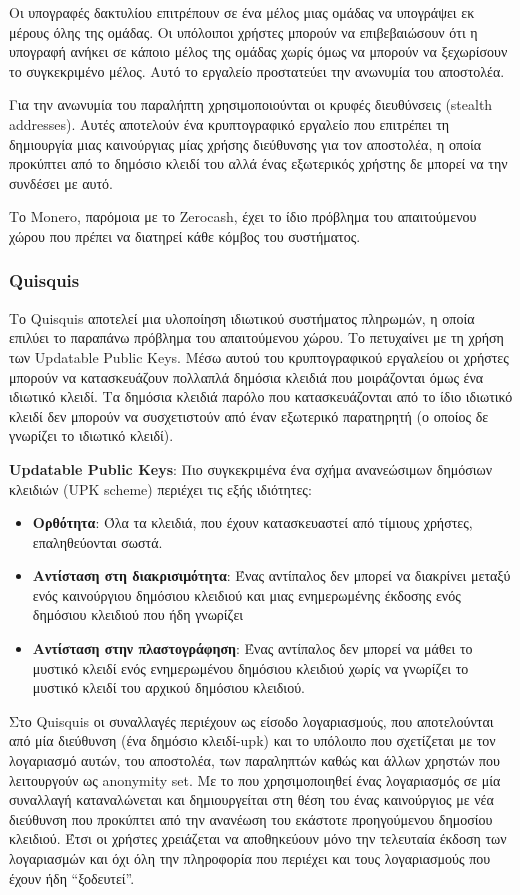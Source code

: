 Οι υπογραφές δακτυλίου επιτρέπουν σε ένα μέλος μιας ομάδας να υπογράψει εκ μέρους όλης της ομάδας. Οι υπόλοιποι χρήστες μπορούν να επιβεβαιώσουν ότι η υπογραφή ανήκει σε κάποιο μέλος της ομάδας χωρίς όμως να μπορούν να ξεχωρίσουν το συγκεκριμένο μέλος. Αυτό το εργαλείο προστατεύει την ανωνυμία του αποστολέα.

Για την ανωνυμία του παραλήπτη χρησιμοποιούνται οι κρυφές διευθύνσεις (stealth addresses). Αυτές αποτελούν ένα κρυπτογραφικό εργαλείο που  επιτρέπει τη δημιουργία μιας καινούργιας μίας χρήσης διεύθυνσης για τον αποστολέα, η οποία προκύπτει από το δημόσιο κλειδί του αλλά ένας εξωτερικός χρήστης δε μπορεί να την συνδέσει με αυτό.

Το Monero, παρόμοια με το Zerocash, έχει το ίδιο πρόβλημα του απαιτούμενου χώρου που πρέπει να διατηρεί κάθε κόμβος του συστήματος.

\subsubsection{Quisquis}
Το Quisquis αποτελεί μια υλοποίηση ιδιωτικού συστήματος πληρωμών, η οποία επιλύει το παραπάνω πρόβλημα του απαιτούμενου χώρου. Το πετυχαίνει με τη χρήση των Updatable Public Keys. Μέσω αυτού του κρυπτογραφικού εργαλείου οι χρήστες μπορούν να κατασκευάζουν πολλαπλά δημόσια κλειδιά που μοιράζονται όμως ένα ιδιωτικό κλειδί. Τα δημόσια κλειδιά παρόλο που κατασκευάζονται από το ίδιο ιδιωτικό κλειδί δεν μπορούν να συσχετιστούν από έναν εξωτερικό παρατηρητή (ο οποίος δε γνωρίζει το ιδιωτικό κλειδί). 

\textbf{Updatable Public Keys}:
Πιο συγκεκριμένα ένα σχήμα ανανεώσιμων δημόσιων κλειδιών (UPK scheme) περιέχει τις εξής ιδιότητες:
\begin{itemize}
    \item \textbf{Ορθότητα}: Όλα τα κλειδιά, που έχουν κατασκευαστεί από τίμιους χρήστες, επαληθεύονται σωστά.
    \item \textbf{Αντίσταση στη διακρισιμότητα}: Ένας αντίπαλος δεν μπορεί να διακρίνει μεταξύ ενός καινούργιου δημόσιου κλειδιού και μιας ενημερωμένης έκδοσης ενός δημόσιου κλειδιού που ήδη γνωρίζει
    \item \textbf{Αντίσταση στην πλαστογράφηση}: Ένας αντίπαλος δεν μπορεί να μάθει το μυστικό κλειδί ενός ενημερωμένου δημόσιου κλειδιού χωρίς να γνωρίζει το μυστικό κλειδί του αρχικού δημόσιου κλειδιού.
\end{itemize}

Στο Quisquis οι συναλλαγές περιέχουν ως είσοδο λογαριασμούς, που αποτελούνται από μία διεύθυνση (ένα δημόσιο κλειδί-upk) και το υπόλοιπο που σχετίζεται με τον λογαριασμό αυτών, του αποστολέα, των παραληπτών καθώς και άλλων χρηστών που λειτουργούν ως anonymity set. Με το που χρησιμοποιηθεί ένας λογαριασμός σε μία συναλλαγή καταναλώνεται και δημιουργείται στη θέση του ένας καινούργιος με νέα διεύθυνση που προκύπτει από την ανανέωση του εκάστοτε προηγούμενου δημοσίου κλειδιού. Έτσι οι χρήστες χρειάζεται να αποθηκεύουν μόνο την τελευταία έκδοση των λογαριασμών και όχι όλη την πληροφορία που περιέχει και τους λογαριασμούς που έχουν ήδη ``ξοδευτεί''.

